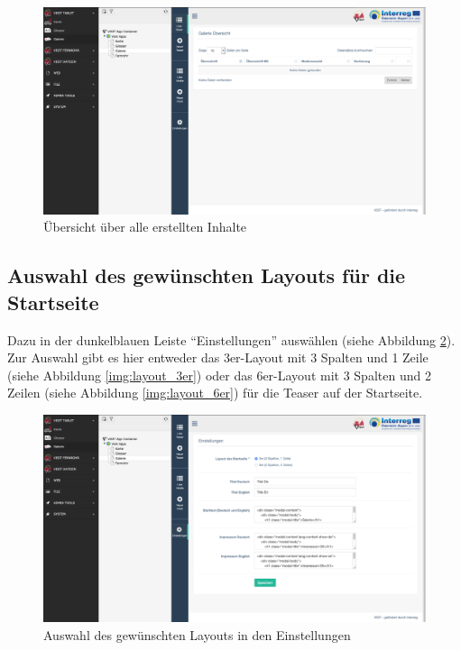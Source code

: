 \begin{figure}[ht!]
\centering
\includegraphics[width=12cm]{Figures/paula/galerie/uebersicht_galerie.png}
\caption{Übersicht über alle erstellten Inhalte}
\label{img:uebersicht_galerie}
\end{figure}

\subsection{Auswahl des gewünschten Layouts für die Startseite}

Dazu in der dunkelblauen Leiste “Einstellungen” auswählen (siehe Abbildung  \ref{img:auswahl_layout}). Zur Auswahl gibt es hier entweder das 3er-Layout mit 3 Spalten und 1 Zeile (siehe Abbildung \ref{img:layout_3er}) oder das 6er-Layout mit 3 Spalten und 2 Zeilen (siehe Abbildung \ref{img:layout_6er}) für die Teaser auf der Startseite.

\begin{figure}[ht!]
\centering
\includegraphics[width=12cm]{Figures/paula/galerie/auswahl_layout.png}
\caption{Auswahl des gewünschten Layouts in den Einstellungen}
\label{img:auswahl_layout}
\end{figure}


